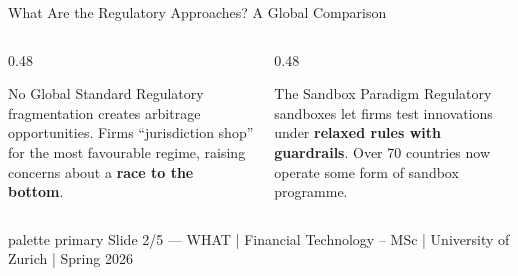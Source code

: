 \documentclass[aspectratio=169, 11pt]{beamer}
\newcommand{\bottomnote}[1]{%
  \vfill
  \begin{beamercolorbox}[wd=\textwidth,ht=2ex,dp=1ex]{palette primary}%
    \tiny\hspace{1em}#1%
  \end{beamercolorbox}}
\begin{document}
\begin{frame}[shrink=5]{What Are the Regulatory Approaches? A Global Comparison}
\vspace{0.3em}
\begin{columns}[T]
\begin{column}{0.48\textwidth}
  \begin{block}{No Global Standard}
    \scriptsize
    Regulatory fragmentation creates arbitrage opportunities.
    Firms ``jurisdiction shop'' for the most favourable regime,
    raising concerns about a \textbf{race to the bottom}.
  \end{block}
\end{column}
\begin{column}{0.48\textwidth}
  \begin{alertblock}{\scriptsize The Sandbox Paradigm}
    \scriptsize
    Regulatory sandboxes let firms test innovations under
    \textbf{relaxed rules with guardrails}. Over 70 countries
    now operate some form of sandbox programme.
  \end{alertblock}
\end{column}
\end{columns}

\bottomnote{Slide 2/5 --- WHAT | Financial Technology -- MSc | University of Zurich | Spring 2026}
\end{frame}
\end{document}
